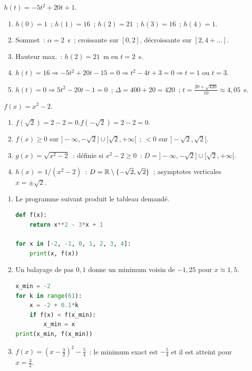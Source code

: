 
$h(t)=-5t^2+20t+1$.
\begin{enumerate}
  \item $h(0)=1$~; $h(1)=16$~; $h(2)=21$~; $h(3)=16$~; $h(4)=1$.
  \item Sommet~: $\alpha=2$~s~; croissante sur $[0,2]$, d\'ecroissante sur $[2,4+...]$.
  \item Hauteur max.~: $h(2)=21$~m en $t=2$~s.
  \item $h(t)=16\Rightarrow-5t^2+20t-15=0\Rightarrow t^2-4t+3=0\Rightarrow t=1$ ou $t=3$.
  \item $h(t)=0\Rightarrow5t^2-20t-1=0$~; $\Delta=400+20=420$~; $t=\frac{20+\sqrt{420}}{10}\approx4{,}05$~s.
\end{enumerate}


$f(x)=x^2-2$.
\begin{enumerate}
  \item $f(\sqrt{2})=2-2=0$.\checkmark\quad $f(-\sqrt{2})=2-2=0$.\checkmark
  \item $f(x)\geq0$ sur $]-\infty,-\sqrt{2}]\cup[\sqrt{2},+\infty[$~; $<0$ sur $]-\sqrt{2},\sqrt{2}[$.
  \item $g(x)=\sqrt{x^2-2}$~: d\'efinie si $x^2-2\geq0$~: $D=]-\infty,-\sqrt{2}]\cup[\sqrt{2},+\infty[$.
  \item $h(x)=1/(x^2-2)$~: $D=\mathbb{R}\setminus\{-\sqrt{2},\sqrt{2}\}$~;
        asymptotes verticales $x=\pm\sqrt{2}$.
\end{enumerate}


\begin{enumerate}
  \item Le programme suivant produit le tableau demand\'e.
\begin{lstlisting}[language=Python]
def f(x):
    return x**2 - 3*x + 1

for x in [-2, -1, 0, 1, 2, 3, 4]:
    print(x, f(x))
\end{lstlisting}
  \item Un balayage de pas $0{,}1$ donne un minimum voisin de $-1{,}25$
        pour $x\approx1{,}5$.
\begin{lstlisting}[language=Python]
x_min = -2
for k in range(61):
    x = -2 + 0.1*k
    if f(x) < f(x_min):
        x_min = x
print(x_min, f(x_min))
\end{lstlisting}
  \item $f(x)=\left(x-\frac32\right)^2-\frac54$~: le minimum exact est
        $-\frac54$ et il est atteint pour $x=\frac32$.
\end{enumerate}

